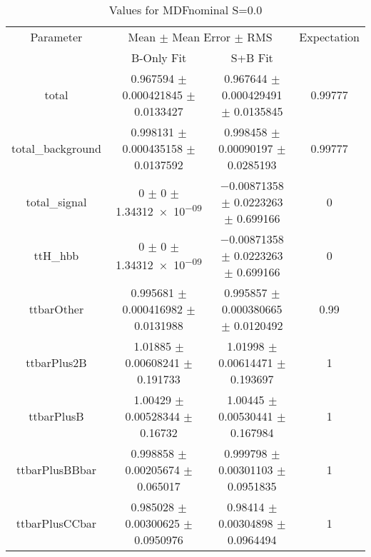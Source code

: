 \begin{table}
\centering
\caption{Values for MDFnominal S=0.0}
\begin{tabular}{cccc}
\toprule
Parameter & \multicolumn{2}{c}{Mean $\pm$ Mean Error $\pm$ RMS} & Expectation\\
 & B-Only Fit & S+B Fit & \\
\midrule
total & \num{0.967594} $\pm$ \num{0.000421845} $\pm$ \num{0.0133427} & \num{0.967644} $\pm$ \num{0.000429491} $\pm$ \num{0.0135845} & \num{0.99777}\\
total\_background & \num{0.998131} $\pm$ \num{0.000435158} $\pm$ \num{0.0137592} & \num{0.998458} $\pm$ \num{0.00090197} $\pm$ \num{0.0285193} & \num{0.99777}\\
total\_signal & \num{0} $\pm$ \num{0} $\pm$ \num{1.34312e-09} & \num{-0.00871358} $\pm$ \num{0.0223263} $\pm$ \num{0.699166} & \num{0}\\
ttH\_hbb & \num{0} $\pm$ \num{0} $\pm$ \num{1.34312e-09} & \num{-0.00871358} $\pm$ \num{0.0223263} $\pm$ \num{0.699166} & \num{0}\\
ttbarOther & \num{0.995681} $\pm$ \num{0.000416982} $\pm$ \num{0.0131988} & \num{0.995857} $\pm$ \num{0.000380665} $\pm$ \num{0.0120492} & \num{0.99}\\
ttbarPlus2B & \num{1.01885} $\pm$ \num{0.00608241} $\pm$ \num{0.191733} & \num{1.01998} $\pm$ \num{0.00614471} $\pm$ \num{0.193697} & \num{1}\\
ttbarPlusB & \num{1.00429} $\pm$ \num{0.00528344} $\pm$ \num{0.16732} & \num{1.00445} $\pm$ \num{0.00530441} $\pm$ \num{0.167984} & \num{1}\\
ttbarPlusBBbar & \num{0.998858} $\pm$ \num{0.00205674} $\pm$ \num{0.065017} & \num{0.999798} $\pm$ \num{0.00301103} $\pm$ \num{0.0951835} & \num{1}\\
ttbarPlusCCbar & \num{0.985028} $\pm$ \num{0.00300625} $\pm$ \num{0.0950976} & \num{0.98414} $\pm$ \num{0.00304898} $\pm$ \num{0.0964494} & \num{1}\\
\bottomrule
\end{tabular}
\end{table}